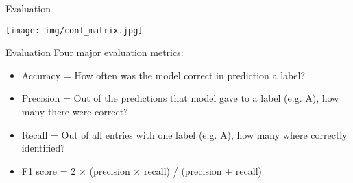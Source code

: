 \documentclass{beamer}
\begin{document}
\begin{frame}{Evaluation}
    \begin{center}
        \texttt{[image: img/conf\_matrix.jpg]}
    \end{center}
\end{frame}

\begin{frame}{Evaluation}
    Four major evaluation metrics:

    \begin{itemize}
        \item Accuracy = How often was the model correct in prediction a label?
        \item Precision = Out of the predictions that model gave to a label (e.g. A), how many there were correct?
        \item Recall = Out of all entries with one label (e.g. A), how many where correctly identified?
        \item F1 score = 2 × (precision × recall) / (precision + recall)
    \end{itemize}
    
\end{frame}
\end{document}
